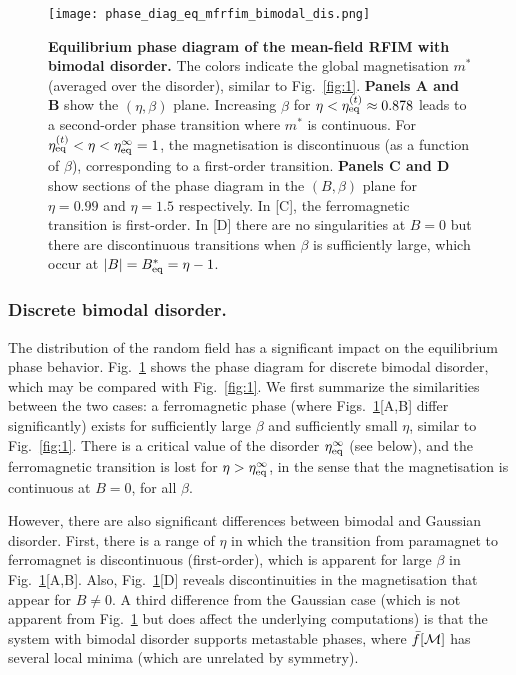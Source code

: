 \documentclass{iopart}
\begin{document}
\begin{figure}
  \centering
  \texttt{[image: phase\_diag\_eq\_mfrfim\_bimodal\_dis.png]}
  \caption{\textbf{Equilibrium phase diagram of the mean-field RFIM with bimodal disorder.} 
   The colors indicate the global magnetisation $m^{\ast}$ (averaged over the disorder), similar to Fig.~\ref{fig:1}.
 \textbf{Panels A and B} show the $(\eta, \beta)$ plane.  
Increasing $\beta$ for $\eta < \eta_{\rm eq}^{(t)}\approx 0.878$ leads to a second-order phase transition where $m^{\ast}$ is continuous.  For $\eta_{\rm eq}^{(t)} < \eta < \eta_{\rm eq}^{\infty}=1$, the magnetisation is discontinuous (as a function of $\beta$), corresponding to a first-order transition. 
\textbf{Panels C and D} show sections of the phase diagram in the $(B,\beta)$ plane for $\eta=0.99$ and $\eta=1.5$ respectively.  In [C], the ferromagnetic transition is first-order.  In [D] there are no singularities at $B=0$ but there are discontinuous transitions when $\beta$ is sufficiently large, which occur at $|B|=B_{\rm eq}^{\ast}=\eta - 1$.
}
  \label{fig:2}
\end{figure}


\subsubsection{Discrete bimodal disorder.}
\label{sec:eqm-bimodal}

The distribution of the random field has a significant impact on the equilibrium phase behavior.  Fig.~\ref{fig:2} shows the phase diagram for discrete bimodal disorder, which may be compared with Fig.~\ref{fig:1}.
%
We first summarize the similarities between the two cases:
a ferromagnetic phase (where Figs.~\ref{fig:2}[A,B] differ significantly) exists for sufficiently large $\beta$ and sufficiently small $\eta$, similar to Fig.~\ref{fig:1}.  There is a critical value of the disorder $\eta_{\rm eq}^{\infty}$
(see below), and the ferromagnetic transition is lost for $\eta>\eta_{\rm eq}^{\infty} $, in the sense that the magnetisation is continuous at $B=0$, for all $\beta$.

However, there are also significant differences between bimodal and Gaussian disorder.  First, there is a range of $\eta$ in which the transition from paramagnet to ferromagnet is discontinuous (first-order), which is apparent for large $\beta$ in Fig.~\ref{fig:2}[A,B].   Also, Fig.~\ref{fig:2}[D] reveals discontinuities in the magnetisation that appear for $B\neq0$.  A third difference from the Gaussian case (which is not apparent from Fig.~\ref{fig:2} but does affect the underlying computations) is that the system with bimodal disorder supports metastable phases, where $\bar f[{\cal M}]$ has several local minima (which are unrelated by symmetry).
\end{document}
